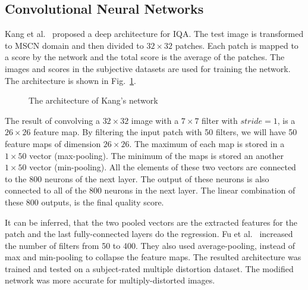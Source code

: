 \subsection{Convolutional Neural Networks}
Kang et al.~\cite{Kang2014} proposed a deep architecture for IQA. The test image is transformed to MSCN domain and then divided to $32\times32$ patches. Each patch is mapped to a score by the network and the total score is the average of the patches. The images and scores in the subjective datasets are used for training the network. The architecture is shown in Fig.~\ref{fig:lekang}.
\begin{figure}
    \centering
    \caption{The architecture of Kang's network}
    \label{fig:lekang}
\end{figure}

The result of convolving a $32\times 32$ image with a $7\times 7$ filter with $stride=1$, is a $26\times 26$ feature map. By filtering the input patch with 50 filters, we will have 50 feature maps of dimension $26\times 26$. The maximum of each map is stored in a $1\times 50$ vector (max-pooling). The minimum of the maps is stored an another $1\times 50$ vector (min-pooling). All the elements of these two vectors are connected to the 800 neurons of the next layer. The output of these neurons is also connected to all of the 800 neurons in the next layer. The linear combination of these 800 outputs, is the final quality score. 

It can be inferred, that the two pooled vectors are the extracted features for the patch and the last fully-connected layers do the regression. Fu et al.~\cite{Fu2016} increased the number of filters from 50 to 400. They also used average-pooling, instead of max and min-pooling to collapse the feature maps. The resulted architecture was trained and tested on a subject-rated multiple distortion dataset. The modified network was more accurate for multiply-distorted images. 

